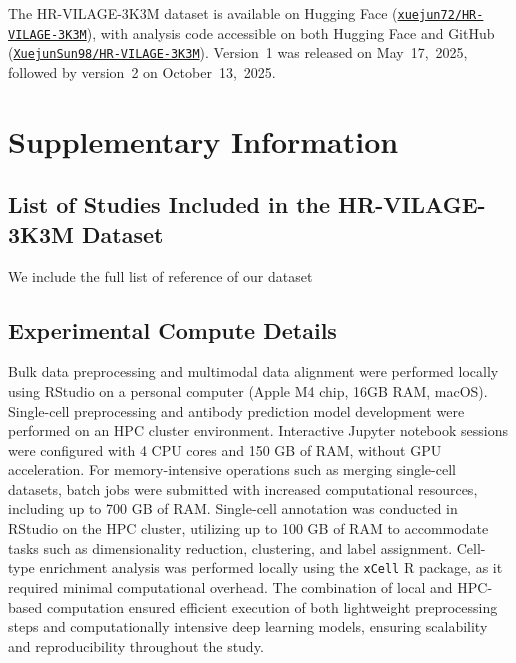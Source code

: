 \documentclass[
  12pt]{article}
\begin{document}
The HR-VILAGE-3K3M dataset is available on Hugging Face (\href{https://huggingface.co/datasets/xuejun72/HR-VILAGE-3K3M}{\texttt{xuejun72/HR-VILAGE-3K3M}}), with analysis code accessible on both Hugging Face and GitHub (\href{https://github.com/XuejunSun98/HR-VILAGE-3K3M}{\texttt{XuejunSun98/HR-VILAGE-3K3M}}). Version~1 was released on May~17,~2025, followed by version~2 on October~13,~2025.

\clearpage
{}
\label{supplementary-material}

\section*{Supplementary Information}

\subsection{List of Studies Included in the HR-VILAGE-3K3M Dataset}
We include the full list of reference of our dataset~\citealp{lindeboom2024human,proud2008gene,davenport2015transcriptomic,muller2017development,habibi2020neutrophilic,liu2016individualized,zhai2015host,sparks2023influenza,jochems2018inflammation,nakaya2015systems,franco2013integrative,bucasas2011early,furman2013apoptosis,furman2014systems,furman2017expression,thakar2015aging,avey2020seasonal,tsang2014global,rinchai2022high,forst2022vaccination,odak2024systems,lee2022comprehensive,lee2022heterologous,lee2022mrna,lee2022prior,ryan2023systems,watanabe2023time,drury2024multi,grewe2024mva,chang2024altered,chang2024network,arunachalam2021systems,wimmers2021single,aydillo2022transcriptome,thwaites2023early,nakaya2011systems,cao2014differences,obermoser2013systems,narang2018influenza,monaco2019rna,carre2021endoplasmic,henn2013high,sarin2024impaired,huang2024interferon,ivanova2023mrna,kim2022germinal,lindeboom2023human,stephenson2024temporal,blazkova2017multicenter,alpert2019clinically,tomic2019fluprint}

\subsection{Experimental Compute Details}
Bulk data preprocessing and multimodal data alignment were performed locally using RStudio on a personal computer (Apple M4 chip, 16GB RAM, macOS). Single-cell preprocessing and antibody prediction model development were performed on an HPC cluster environment. Interactive Jupyter notebook sessions were configured with 4 CPU cores and 150 GB of RAM, without GPU acceleration. For memory-intensive operations such as merging single-cell datasets, batch jobs were submitted with increased computational resources, including up to 700 GB of RAM. Single-cell annotation was conducted in RStudio on the HPC cluster, utilizing up to 100 GB of RAM to accommodate tasks such as dimensionality reduction, clustering, and label assignment. Cell-type enrichment analysis was performed locally using the \texttt{xCell} R package, as it required minimal computational overhead. The combination of local and HPC-based computation ensured efficient execution of both lightweight preprocessing steps and computationally intensive deep learning models, ensuring scalability and reproducibility throughout the study.
\end{document}
